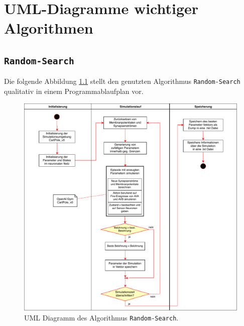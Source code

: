 \appendix
%
\chapter{UML-Diagramme wichtiger Algorithmen}
\label{app:UML}
%

	\section{\texttt{Random-Search}}
	\label{app:UML_RS}
		Die folgende Abbildung \ref{fig:uml_rs} stellt den genutzten Algorithmus \texttt{Random-Search} qualitativ in einem Programmablaufplan vor.
		\begin{figure}[H]
			\centering
			\includegraphics[width=14cm]{figures/appendix/uml_rs.pdf}
			\caption{UML Diagramm des Algorithmus \texttt{Random-Search}.}
			\label{fig:uml_rs}
		\end{figure}
	
